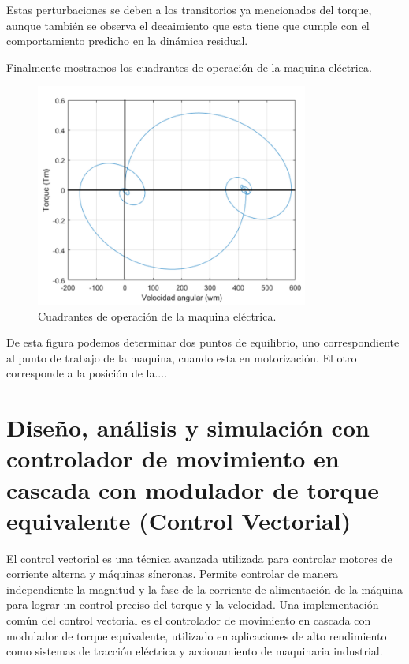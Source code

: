 \documentclass{article}
\begin{document}
Estas perturbaciones se deben a los transitorios ya mencionados del torque, aunque también se observa 
el decaimiento que esta tiene que cumple con el comportamiento predicho en la dinámica residual. 

Finalmente mostramos los cuadrantes de operación de la maquina eléctrica.

\begin{figure}[H]
    \centering
    \includegraphics[width=0.8\textwidth]{5.1.6_torque_velocidad.png}
    \caption{Cuadrantes de operación de la maquina eléctrica.}
\end{figure}

De esta figura podemos determinar dos puntos de equilibrio, uno correspondiente al punto de trabajo 
de la maquina, cuando esta en motorización. El otro corresponde a la posición de la....




\section{Diseño, análisis y simulación con controlador de movimiento en cascada con modulador de torque equivalente (Control Vectorial)}

El control vectorial es una técnica avanzada utilizada para controlar motores de corriente alterna y máquinas 
síncronas. Permite controlar de manera independiente la magnitud y la fase de la corriente de alimentación de la 
máquina para lograr un control preciso del torque y la velocidad. Una implementación común del control vectorial 
es el controlador de movimiento en cascada con modulador de torque equivalente, utilizado en aplicaciones de alto 
rendimiento como sistemas de tracción eléctrica y accionamiento de maquinaria industrial.
\end{document}
